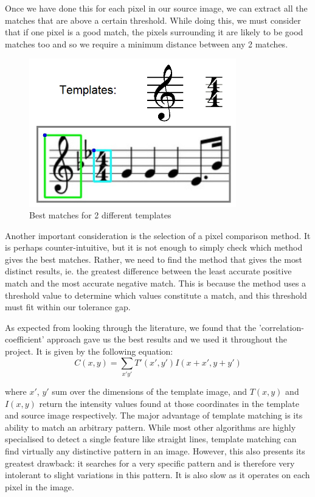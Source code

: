 Once we have done this for each pixel in our source image, we can extract all the matches that are above a certain threshold. While doing this, we must consider that if one pixel is a good match, the pixels surrounding it are likely to be good matches too and so we require a minimum distance between any 2 matches.
    
            \begin{figure}[h!]
                \centering
                \includegraphics[width=90mm]{./assets/templatematch.png}
                \caption{Best matches for 2 different templates}
                \label{image:templatematch}
            \end{figure}

Another important consideration is the selection of a pixel comparison method. It is perhaps counter-intuitive, but it is not enough to simply check which method gives the best matches. Rather, we need to find the method that gives the most distinct results, ie. the greatest difference between the least accurate positive match and the most accurate negative match. This is because the method uses a threshold value to determine
which values constitute a match, and this threshold must fit within our tolerance gap.

As expected from looking through the literature, we found that the 'correlation-coefficient' approach gave us the best results and we used it throughout the project.  
It is given by the following equation:
\begin{equation}
	C(x,y) = \sum_{x'y'} T'(x',y') I(x+x',y+y')
\end{equation}

where $x'$, $y'$ sum over the dimensions of the template image, and $T(x,y)$ and $I(x,y)$ return the intensity values found at those coordinates in the template and source image respectively.
The major advantage of template matching is its ability to match an arbitrary pattern. While most other algorithms are highly specialised to detect a single feature like straight lines, template matching can find virtually any distinctive pattern in an image. However, this also presents its greatest drawback: it searches for a very specific pattern and is therefore very intolerant to slight variations in this pattern. It
is also slow as it operates on each pixel in the image.

